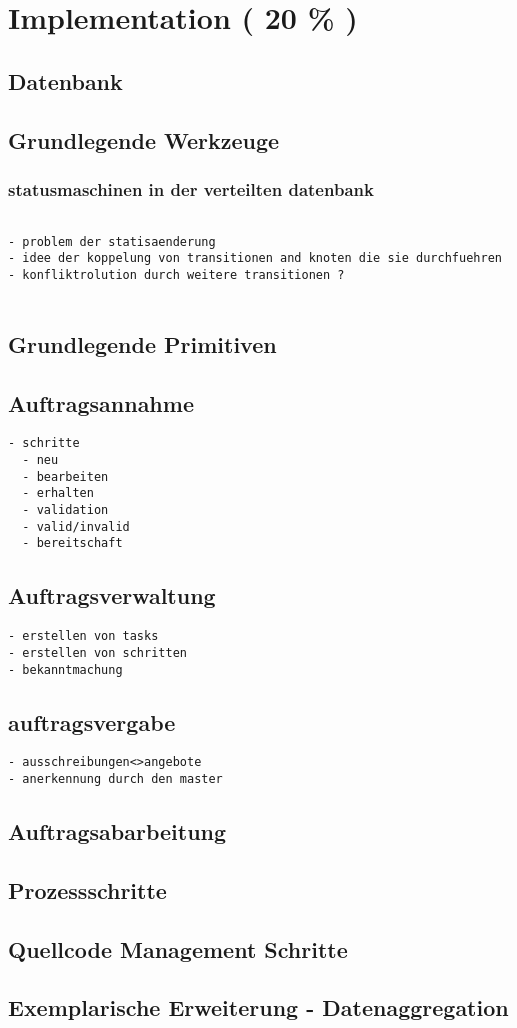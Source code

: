 \chapter{Implementation ( 20 \% ) }
\section{Datenbank}
\section{Grundlegende Werkzeuge}
\subsection{statusmaschinen in der verteilten datenbank}

\begin{verbatim}

- problem der statisaenderung
- idee der koppelung von transitionen and knoten die sie durchfuehren
- konfliktrolution durch weitere transitionen ?


\end{verbatim}
\section{Grundlegende Primitiven}
\section{Auftragsannahme}

\begin{verbatim}
- schritte
  - neu
  - bearbeiten
  - erhalten
  - validation
  - valid/invalid
  - bereitschaft
\end{verbatim}

\section{Auftragsverwaltung}

\begin{verbatim}
- erstellen von tasks
- erstellen von schritten
- bekanntmachung
\end{verbatim}

\section{auftragsvergabe}

\begin{verbatim}
- ausschreibungen<>angebote
- anerkennung durch den master

\end{verbatim}

\section{Auftragsabarbeitung}
\section{Prozessschritte}
\section{Quellcode Management Schritte}
\section{Exemplarische Erweiterung - Datenaggregation}
